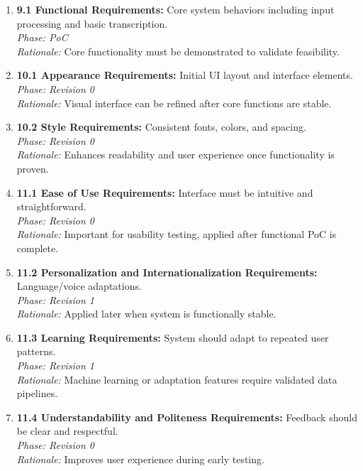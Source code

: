 \documentclass[11pt]{article}
\begin{document}
\begin{enumerate}
    \item \textbf{9.1 Functional Requirements:} Core system behaviors including input processing and basic transcription.\\
    \textit{Phase: PoC} \\
    \textit{Rationale:} Core functionality must be demonstrated to validate feasibility.

    \item \textbf{10.1 Appearance Requirements:} Initial UI layout and interface elements.\\
    \textit{Phase: Revision 0} \\
    \textit{Rationale:} Visual interface can be refined after core functions are stable.

    \item \textbf{10.2 Style Requirements:} Consistent fonts, colors, and spacing.\\
    \textit{Phase: Revision 0} \\
    \textit{Rationale:} Enhances readability and user experience once functionality is proven.

    \item \textbf{11.1 Ease of Use Requirements:} Interface must be intuitive and straightforward.\\
    \textit{Phase: Revision 0} \\
    \textit{Rationale:} Important for usability testing, applied after functional PoC is complete.

    \item \textbf{11.2 Personalization and Internationalization Requirements:} Language/voice adaptations.\\
    \textit{Phase: Revision 1} \\
    \textit{Rationale:} Applied later when system is functionally stable.

    \item \textbf{11.3 Learning Requirements:} System should adapt to repeated user patterns.\\
    \textit{Phase: Revision 1} \\
    \textit{Rationale:} Machine learning or adaptation features require validated data pipelines.

    \item \textbf{11.4 Understandability and Politeness Requirements:} Feedback should be clear and respectful.\\
    \textit{Phase: Revision 0} \\
    \textit{Rationale:} Improves user experience during early testing.


\end{enumerate}
\end{document}
